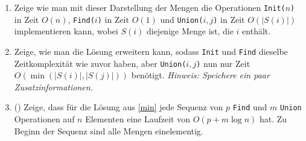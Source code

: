 \documentclass{uebung_cs}
\begin{document}
\begin{aufgabe}
\begin{center}
	\end{center}
	\begin{enumerate}
		\item Zeige wie man mit dieser Darstellung der Mengen die Operationen \texttt{Init($n$)} in Zeit $O(n)$, \texttt{Find($i$)} in Zeit $O(1)$ und \texttt{Union($i,j$)} in Zeit $O(|S(i)|)$ implementieren kann, wobei $S(i)$ diejenige Menge ist, die $i$ enthält.
		\item\label{min} Zeige, wie man die Lösung erweitern kann, sodass \texttt{Init} und \texttt{Find} dieselbe Zeitkomplexität wie zuvor haben, aber \texttt{Union($i,j$)} nun nur Zeit $O(\min(|S(i)|, |S(j)|))$ benötigt.
			\textit{Hinweis: Speichere ein paar Zusatzinformationen.}
		\item (\hard) Zeige, dass für die Lösung aus \ref{min} jede Sequenz von $p$ \texttt{Find} und $m$ \texttt{Union} Operationen auf $n$ Elementen eine Laufzeit von $O(p + m\log n)$ hat.
		Zu Beginn der Sequenz sind alle Mengen einelementig.
	\end{enumerate}
\end{aufgabe}
\end{document}
